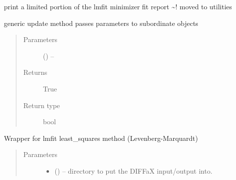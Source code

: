 \documentclass[letterpaper,10pt,english]{sphinxmanual}
\begin{document}
\begin{fulllineitems}
\begin{fulllineitems}
\label{\detokenize{rst/pairdistributionfunction:mstack.pairdistributionfunction.PdfRefinement.filter_report}}
print a limited portion of the lmfit minimizer fit report
\textasciitilde{}! moved to utilities

\end{fulllineitems}


\begin{fulllineitems}
\label{\detokenize{rst/pairdistributionfunction:mstack.pairdistributionfunction.PdfRefinement.generic_update}}
generic update method passes parameters to subordinate objects
\begin{quote}\begin{description}
\item[{Parameters}] \leavevmode
{} () -- 

\item[{Returns}] \leavevmode
True

\item[{Return type}] \leavevmode
bool

\end{description}\end{quote}

\end{fulllineitems}


\begin{fulllineitems}
\label{\detokenize{rst/pairdistributionfunction:mstack.pairdistributionfunction.PdfRefinement.lsq_minimize}}
Wrapper for lmfit least\_squares method (Levenberg-Marquardt)
\begin{quote}\begin{description}
\item[{Parameters}] \leavevmode\begin{itemize}
\item {} 
 () -- directory to put the DIFFaX input/output into.


\end{itemize}
\end{description}
\end{quote}
\end{fulllineitems}
\end{fulllineitems}
\end{document}
